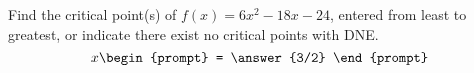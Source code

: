 \documentclass{ximera}
\author{Gregory Hartman \and Matthew Carr}
\begin{document}
\begin{exercise}




Find the critical point(s) of $f(x)=6x^2-18x-24$, entered from least to greatest, or indicate there exist no critical points with DNE.
\[
x
\begin{prompt}
= \answer{3/2}
\end{prompt}
\]

\end{exercise}
\end{document}
